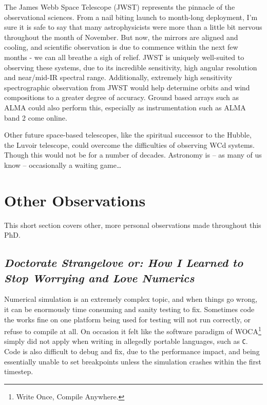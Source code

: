 The James Webb Space Telescope (JWST) represents the pinnacle of the observational sciences.
From a nail biting launch to month-long deployment, I'm sure it is safe to say that many astrophysicists were more than a little bit nervous throughout the month of November.
But now, the mirrors are aligned and cooling, and scientific observation is due to commence within the next few months - we can all breathe a sigh of relief.
JWST is uniquely well-suited to observing these systems, due to its incredible sensitivity, high angular resolution and near/mid-IR spectral range.
Additionally, extremely high sensitivity spectrographic observation from JWST would help determine orbits and wind compositions to a greater degree of accuracy.
Ground based arrays such as ALMA could also perform this, especially as instrumentation such as ALMA band 2 come online.

Other future space-based telescopes, like the spiritual successor to the Hubble, the Luvoir telescope, could overcome the difficulties of observing WCd systems.
Though this would not be for a number of decades.
Astronomy is -- as many of us know -- occasionally a waiting game\ldots


\section{Other Observations}

This short section covers other, more personal observations made throughout this PhD.

\subsection[\textit{How I Learned to Stop Worrying and Love Numerics}]{\textit{Doctorate Strangelove or: How I Learned to Stop Worrying and Love Numerics}}

Numerical simulation is an extremely complex topic, and when things go wrong, it can be enormously time consuming and sanity testing to fix.
Sometimes code the works fine on one platform being used for testing will not run correctly, or refuse to compile at all.
On occasion it felt like the software paradigm of WOCA\footnote{Write Once, Compile Anywhere.} simply did not apply when writing in allegedly portable languages, such as \texttt{C}.
Code is also difficult to debug and fix, due to the performance impact, and being essentially unable to set breakpoints unless the simulation crashes within the first timestep.

